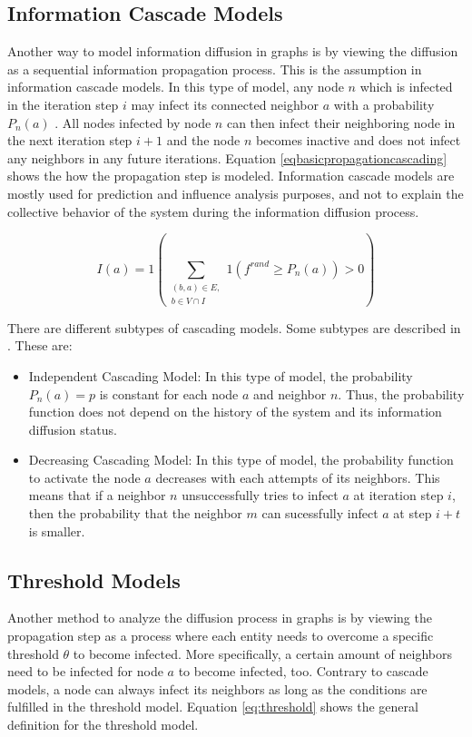 \subsection{Information Cascade Models}

Another way to model information diffusion in graphs is by viewing the diffusion as a 
sequential information propagation process. This is the assumption in
information cascade models. In this type of model, any node $n$ which is infected in the
iteration step $i$ may infect its connected neighbor $a$ with a probability $P_n(a)$
\cite{reviewinformationdiffusion}. All nodes infected by node $n$
can then infect their neighboring node in the next iteration step $i+1$
and the node $n$ becomes inactive and does not infect any neighbors in any future
iterations.
Equation \ref{eqbasicpropagationcascading} 
shows the how the propagation step is modeled.
Information cascade models are mostly used for prediction and influence 
analysis purposes, and not to explain the collective behavior
of the system during the information diffusion process.

\begin{equation}
    I(a) = 1 (\sum\limits_{\substack{(b,a)\in E, \\ b \in V \cap I}}
    1(f^{rand}\geq P_n(a))>0) 
    \label{eqbasicpropagationcascading}
\end{equation}

There are different subtypes of cascading models.
Some subtypes are described in \cite{diffusionbasics}. These are:

\begin{itemize}
    \item Independent Cascading Model: In this type of model, the 
    probability $P_n(a)=p$ is constant for each node $a$ and neighbor $n$.
    Thus, the probability function does not depend on the history 
    of the system and its information diffusion status.
    \item Decreasing Cascading Model: In this type of model, the probability
    function to activate the node $a$ decreases with each attempts of its 
    neighbors. This means that if a neighbor $n$ unsuccessfully tries to infect
    $a$ at iteration step $i$, then the probability that the neighbor $m$
    can sucessfully infect $a$ at step $i+t$ is smaller.
\end{itemize}

\subsection{Threshold Models}
Another method to analyze the diffusion process in graphs is by viewing the
propagation step as a process where each entity needs to overcome a 
specific threshold $\theta$ to become infected. More specifically, 
a certain amount of neighbors need to be infected for node $a$ to become 
infected, too. Contrary to cascade models, a node can always 
infect its neighbors as long as the conditions are fulfilled in the threshold 
model. Equation \ref{eq:threshold} shows the general definition 
for the threshold model.

